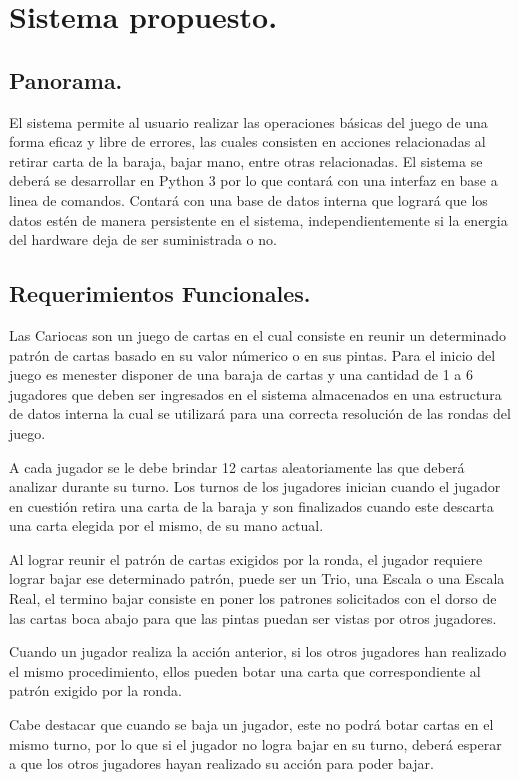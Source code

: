 \section{Sistema propuesto.}\label{cap:sistema}
\subsection{Panorama.}\label{cap:panorama}
El sistema permite al usuario realizar las operaciones básicas del juego de una forma eficaz y libre de errores, las cuales consisten en acciones relacionadas al retirar carta de la baraja, bajar mano, entre otras relacionadas. El sistema se deberá se desarrollar en Python 3 por lo que contará con una interfaz en base a linea de comandos. Contará con una base de datos interna que logrará que los datos estén de manera persistente en el sistema, independientemente si la energia del hardware deja de ser suministrada o no.
\subsection{Requerimientos Funcionales.}\label{cap:requerimientos-funcionales}
Las Cariocas son un juego de cartas en el cual consiste en reunir un determinado patrón de cartas basado en su valor númerico o en sus pintas. Para el inicio del juego es menester disponer de una baraja de cartas y una cantidad de 1 a 6 jugadores que deben ser ingresados en el sistema almacenados en una estructura de datos interna la cual se utilizará para una correcta resolución de las rondas del juego. 

A cada jugador se le debe brindar 12 cartas aleatoriamente las que deberá analizar durante su turno. Los turnos de los jugadores inician cuando el jugador en cuestión retira una carta de la baraja y son finalizados cuando este descarta una carta elegida por el mismo, de su mano actual.

Al lograr reunir el patrón de cartas exigidos por la ronda, el jugador requiere lograr bajar ese determinado patrón, puede ser un Trio, una Escala o una Escala Real, el termino bajar consiste en poner los patrones solicitados con el dorso de las cartas boca abajo para que las pintas puedan ser vistas por otros jugadores.

Cuando un jugador realiza la acción anterior, si los otros jugadores han realizado el mismo procedimiento, ellos pueden botar una carta que correspondiente al patrón exigido por la ronda.

Cabe destacar que cuando se baja un jugador, este no podrá botar cartas en el mismo turno, por lo que si el jugador no logra bajar en su turno, deberá esperar a que los otros jugadores hayan realizado su acción para poder bajar.

